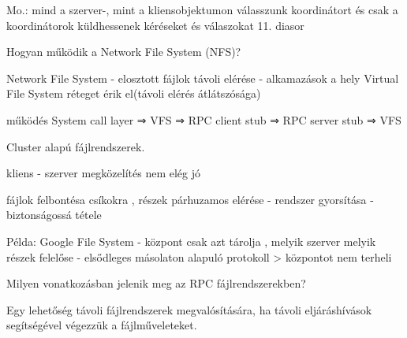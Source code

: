 \documentclass[12pt]{article}
\begin{document}
\begin{description}
                                                                        Mo.: mind a szerver-, mint a kliensobjektumon válasszunk koordinátort és csak a koordinátorok küldhessenek kéréseket és válaszokat
                                                                        11. diasor
                                                                    \item  Hogyan működik a Network File System (NFS)?
                                                                    \item Network File System
                                                                        - elosztott fájlok távoli elérése
                                                                        - alkamazások a hely Virtual File System réteget érik el(távoli elérés átlátszósága)
                                                                    \item működés
                                                                        System call layer ⇒ VFS ⇒ RPC client stub ⇒ RPC server stub ⇒ VFS 
                                                                    \item  Cluster alapú fájlrendszerek.  
                                                                    \item kliens - szerver megközelítés nem elég jó 
                                                                    \item fájlok felbontésa csíkokra , részek párhuzamos elérése
                                                                        - rendszer gyorsítása
                                                                        - biztonságossá tétele
                                                                    \item Példa: Google File System
                                                                        - központ csak azt tárolja , melyik szerver melyik részek felelőse
                                                                        - elsődleges másolaton alapuló protokoll
                                                                        > központot nem terheli
                                                                    \item  Milyen vonatkozásban jelenik meg az RPC fájlrendszerekben?
                                                                    \item Egy lehetőség távoli fájlrendszerek megvalósítására, ha távoli eljáráshívások segítségével végezzük a fájlműveleteket.

\end{description}
\end{document}

